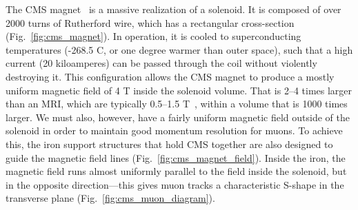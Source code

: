 The CMS magnet~\cite{CERN-LHCC-97-010} is a massive\footnotemark{} realization of a solenoid. 
It is composed of over 2000 turns of Rutherford wire, which has a rectangular cross-section (Fig.~\ref{fig:cms_magnet}). 
In operation, it is cooled to superconducting temperatures (-268.5 \de{}C, or one degree warmer than outer space), such that a high current (20 kiloamperes\footnotemark{}) can be passed through the coil without violently destroying it. 
This configuration allows the CMS magnet to produce a mostly uniform magnetic field of 4 T inside the solenoid volume. 
That is 2--4 times larger than an MRI, which are typically 0.5--1.5 T~\cite{Berger2002-gs}, within a volume that is 1000 times larger. 
We must also, however, have a fairly uniform magnetic field outside of the solenoid in order to maintain good momentum resolution for muons. 
To achieve this, the iron support structures that hold CMS together are also designed to guide the magnetic field lines (Fig.~\ref{fig:cms_magnet_field}). 
Inside the iron, the magnetic field runs almost uniformly parallel to the field inside the solenoid, but in the opposite direction---this gives muon tracks a characteristic S-shape in the transverse plane (Fig.~\ref{fig:cms_muon_diagram}). 

